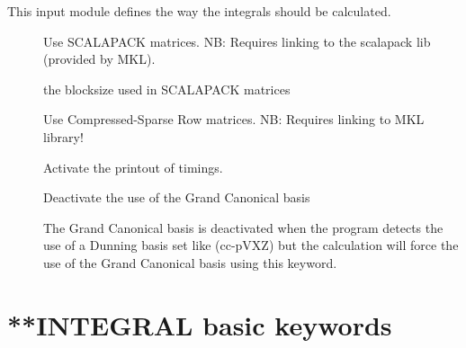 This input module defines the way the integrals should be calculated.
\begin{description}

\item[] Use SCALAPACK matrices. \newline
NB: Requires linking to the scalapack lib (provided by MKL).
\item[] the blocksize used in SCALAPACK matrices
\item[] Use Compressed-Sparse Row matrices. NB: Requires linking to MKL library!
\item[] Activate the printout of timings.
\item[] Deactivate the use of the Grand Canonical basis \cite{trilevel1, trilevel2}
\item[] The Grand Canonical basis \cite{trilevel1, trilevel2} is deactivated when the program
detects the use of a Dunning basis set like (cc-pVXZ) but the calculation will force the use of the Grand Canonical basis using this keyword.

\end{description}
\section{**INTEGRAL basic keywords}\label{sec:integral}

